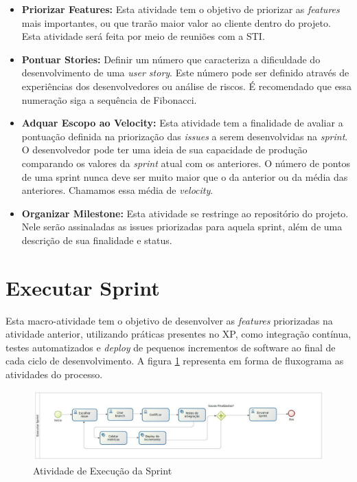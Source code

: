 \begin{itemize}

	\item \textbf{Priorizar Features:} Esta atividade tem o objetivo de priorizar as \textit{features} mais importantes, ou que trarão maior valor ao cliente dentro do projeto. Esta atividade será feita por meio de reuniões com a STI.

	\item \textbf{Pontuar Stories:} Definir um número que caracteriza a dificuldade do desenvolvimento de uma \textit{user story}. Este número pode ser definido através de experiências dos desenvolvedores ou análise de riscos. É recomendado que essa numeração siga a sequência de Fibonacci.

	\item \textbf{Adquar Escopo ao Velocity:} Esta atividade tem a finalidade de avaliar a pontuação definida na priorização das \textit{issues} a serem desenvolvidas na \textit{sprint}. O desenvolvedor pode ter uma ideia de sua capacidade de produção comparando os valores da \textit{sprint} atual com os anteriores. O número de pontos de uma sprint nunca deve ser muito maior que o da anterior ou da média das anteriores. Chamamos essa média de \textit{velocity}.

	\item \textbf{Organizar Milestone:} Esta atividade se restringe ao repositório do projeto. Nele serão assinaladas as issues priorizadas para aquela sprint, além de uma descrição de sua finalidade e status.

\end{itemize}

\section{Executar Sprint}

Esta macro-atividade tem o objetivo de desenvolver as \textit{features} priorizadas na atividade anterior, utilizando práticas presentes no XP, como integração contínua, testes automatizados e \textit{deploy} de pequenos incrementos de software ao final de cada ciclo de desenvolvimento. A figura \ref{fig09} representa em forma de fluxograma as atividades do processo.

\begin{figure}[ht]
	\centering
	\includegraphics[keepaspectratio=true,scale=0.9, width=\textwidth]{figuras/fig09.eps}
	\caption{Atividade de Execução da Sprint}
	\label{fig09}
\end{figure}

